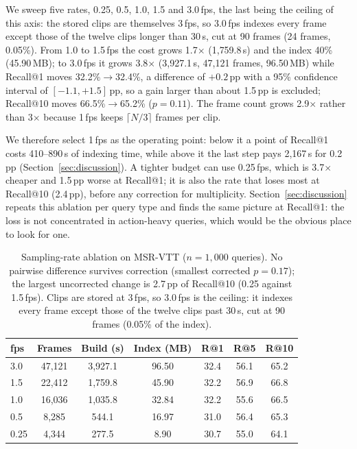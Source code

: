 \documentclass[journal]{IEEEtran}
\begin{document}
We sweep five
rates, 0.25, 0.5, 1.0, 1.5 and
3.0\,fps, the last being the ceiling of this axis: the stored clips are themselves 3\,fps, so
3.0\,fps indexes every frame except those of the twelve clips longer than 30\,s, cut at 90 frames
(24 frames, 0.05\%). From 1.0 to 1.5\,fps the cost grows 1.7$\times$ (1{,}759.8\,s) and the index
40\% (45.90\,MB); to 3.0\,fps it grows 3.8$\times$ (3{,}927.1\,s, 47{,}121 frames, 96.50\,MB) while
Recall@1 moves 32.2\%$\rightarrow$32.4\%, a difference of $+0.2$\,pp with a 95\% confidence
interval of $[-1.1,+1.5]$\,pp, so a gain larger than about 1.5\,pp is excluded; Recall@10 moves
66.5\%$\rightarrow$65.2\% ($p=0.11$). The frame count grows 2.9$\times$ rather than 3$\times$ because
1\,fps keeps $\lceil N/3\rceil$ frames per clip. 

We therefore select 1\,fps as the operating
point: below it a point of Recall@1 costs 410--890\,s of indexing time, while above it the last
step pays 2{,}167\,s for 0.2\,pp (Section~\ref{sec:discussion}). A tighter budget
can use 0.25\,fps, which is 3.7$\times$ cheaper and 1.5\,pp worse at Recall@1; it is also the rate
that loses most at Recall@10 (2.4\,pp), before any correction for multiplicity. Section~\ref{sec:discussion}
repeats this ablation per query type and finds the same picture at Recall@1: the loss is not
concentrated in action-heavy queries, which would be the obvious place to look for one.

\begin{table}[t]
\centering
\caption{Sampling-rate ablation on MSR-VTT ($n=1{,}000$ queries). No pairwise difference survives
correction (smallest corrected $p=0.17$); the largest uncorrected change is 2.7\,pp of Recall@10
(0.25 against 1.5\,fps).
Clips are stored at 3\,fps, so 3.0\,fps is the ceiling: it indexes every frame except those of the
twelve clips past 30\,s, cut at 90 frames (0.05\% of the index).}
\label{tab:fps}
\begin{tabular*}{\columnwidth}{@{\extracolsep{\fill}}lcccccc@{}}
\toprule
fps & Frames & Build (s) & Index (MB) & R@1 & R@5 & R@10 \\
\midrule
3.0  & 47{,}121 & 3{,}927.1 & 96.50 & 32.4 & 56.1 & 65.2 \\
1.5  & 22{,}412 & 1{,}759.8 & 45.90 & 32.2 & 56.9 & 66.8 \\
1.0  & 16{,}036 & 1{,}035.8 & 32.84 & 32.2 & 55.6 & 66.5 \\
0.5  &  8{,}285 &   544.1 & 16.97 & 31.0 & 56.4 & 65.3 \\
0.25 &  4{,}344 &   277.5 &  8.90 & 30.7 & 55.0 & 64.1 \\
\bottomrule
\end{tabular*}
\end{table}
\end{document}
